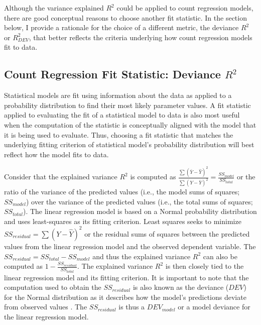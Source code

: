 \documentclass[man]{apa7}
\begin{document}
	Although the variance explained $R^2$ could be applied to count regression models, there are good conceptual reasons to choose another fit statistic. 
	In the section below, I provide a rationale for the choice of a different metric, the deviance $R^2$ or $R^2_{DEV}$, that better reflects the criteria underlying how count regression models fit to data. 
	
	\subsection{Count Regression Fit Statistic: Deviance $R^2$} 
	
	Statistical models are fit using information about the data as applied to a probability distribution to find their most likely parameter values.
	A fit statistic applied to evaluating the fit of a statistical model to data is also most useful when the computation of the statistic is conceptually aligned with the model that it is being used to evaluate.
	Thus, choosing a fit statistic that matches the underlying fitting criterion of statistical model's probability distribution will best reflect how the model fits to data.
	
	Consider that the explained variance $R^2$ is computed as $\frac{\sum (\bar{Y} - \hat{Y})^2}{\sum (Y - \bar{Y})^2} = \frac{SS_{model}}{SS_{total}}$ or the ratio of the variance of the predicted values (i.e., the model sums of squares; $SS_{model}$) over the variance of the predicted values (i.e., the total sums of squares; $SS_{total}$).
	The linear regression model is based on a Normal probability distribution and uses least-squares as its fitting criterion.
	Least squares seeks to minimize $SS_{residual} = \sum (Y - \hat{Y})^2$ or the residual sums of squares between the predicted values from the linear regression model and the observed dependent variable. 
	The $SS_{residual} = SS_{total} - SS_{model}$ and thus the explained variance $R^2$ can also be computed as $1 - \frac{SS_{residual}}{SS_{total}}$.
	The explained variance $R^2$ is then closely tied to the linear regression model and its fitting criterion.
	It is important to note that the computation used to obtain the $SS_{residual}$ is also known as the deviance ($DEV$) for the Normal distribution as it describes how the model's predictions deviate from observed values \parencite{mccullagh2019generalized}.
	The $SS_{residual}$ is thus a $DEV_{model}$ or a model deviance for the linear regression model.
	
\end{document}
